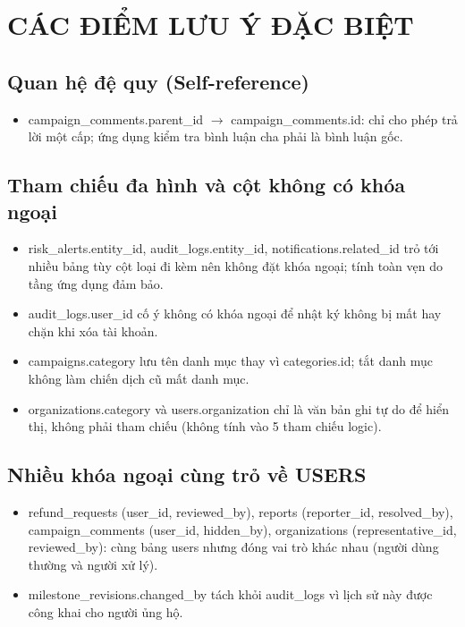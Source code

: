 \section{CÁC ĐIỂM LƯU Ý ĐẶC BIỆT}\label{sec:chuong5}

\subsection{Quan hệ đệ quy (Self-reference)}

\begin{itemize}
    \item campaign\_\allowbreak{}comments.parent\_\allowbreak{}id $\rightarrow$ campaign\_\allowbreak{}comments.id: chỉ cho phép trả lời một cấp; ứng dụng kiểm tra bình luận cha phải là bình luận gốc.
\end{itemize}

\subsection{Tham chiếu đa hình và cột không có khóa ngoại}

\begin{itemize}
    \item risk\_\allowbreak{}alerts.entity\_\allowbreak{}id, audit\_\allowbreak{}logs.entity\_\allowbreak{}id, notifications.related\_\allowbreak{}id trỏ tới nhiều bảng tùy cột loại đi kèm nên không đặt khóa ngoại; tính toàn vẹn do tầng ứng dụng đảm bảo.
    \item audit\_\allowbreak{}logs.user\_\allowbreak{}id cố ý không có khóa ngoại để nhật ký không bị mất hay chặn khi xóa tài khoản.
    \item campaigns.category lưu tên danh mục thay vì categories.id; tắt danh mục không làm chiến dịch cũ mất danh mục.
    \item organizations.category và users.organization chỉ là văn bản ghi tự do để hiển thị, không phải tham chiếu (không tính vào 5 tham chiếu logic).
\end{itemize}

\subsection{Nhiều khóa ngoại cùng trỏ về USERS}

\begin{itemize}
    \item refund\_\allowbreak{}requests (user\_\allowbreak{}id, reviewed\_\allowbreak{}by), reports (reporter\_\allowbreak{}id, resolved\_\allowbreak{}by), campaign\_\allowbreak{}comments (user\_\allowbreak{}id, hidden\_\allowbreak{}by), organizations (representative\_\allowbreak{}id, reviewed\_\allowbreak{}by): cùng bảng users nhưng đóng vai trò khác nhau (người dùng thường và người xử lý).
    \item milestone\_\allowbreak{}revisions.changed\_\allowbreak{}by tách khỏi audit\_\allowbreak{}logs vì lịch sử này được công khai cho người ủng hộ.
\end{itemize}

